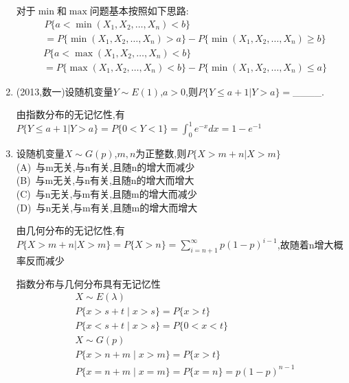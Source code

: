 \documentclass[12pt, a4paper, oneside, UTF8]{ctexbook}
\begin{document}
\begin{enumerate}[label=\arabic*.,start=6]
    \begin{tcolorbox}[title=总结]
        对于$\min\text{和}\max$问题基本按照如下思路:
        \begin{align*}
            &P\{a<\min{(X_1,X_2,\ldots,X_n)}<b\}  \\
            &= P\{\min{(X_1,X_2,\ldots,X_n)}>a\}-P\{\min{(X_1,X_2,\ldots,X_n)}\geq b\}
        \end{align*}
        \begin{align*}
        &P\{a<\max{(X_1,X_2,\ldots,X_n)}<b\} \\
        &=P\{\max{(X_1,X_2,\ldots,X_n)}<b\}-P\{\min{(X_1,X_2,\ldots,X_n)}\leq a\}
        \end{align*}
    \end{tcolorbox}
    \item  (2013,数一)设随机变量$Y\sim E(1)$,$a>0$,则$P\{Y\leq a+1|Y>a\}=$\_\_\_\_.
    
    \begin{solution}
    由指数分布的无记忆性,有$P\{Y\leq a+1|Y>a\}=P\{0<Y<1\}=\int_{0}^{1}e^{-x}dx=1-e^{-1}$
    \end{solution}
    
    \item  设随机变量$X\sim G(p)$,$m,n$为正整数,则$P\{X>m+n|X>m\}$ \\
    (A)\ 与m无关,与n有关,且随n的增大而减少 \\
    (B)\ 与m无关,与n有关,且随n的增大而增大 \\
    (C)\ 与n无关,与m有关,且随m的增大而减少 \\
    (D)\ 与n无关,与m有关,且随m的增大而增大

    \begin{solution}
    由几何分布的无记忆性,有$P\{X>m+n|X>m\}=P\{X>n\}=\sum_{i=n+1}^{\infty}p(1-p)^{i-1}$,故随着n增大概率反而减少
    \end{solution}
    \begin{tcolorbox}[title=总结]
        指数分布与几何分布具有无记忆性
        \begin{align*}
            &X\sim E(\lambda) \\
            &P\{x>s+t\mid x>s\}=P\{x>t\} \\
            &P\{x<s+t\mid x>s\}=P\{0<x<t\} \\
            &X\sim G(p) \\
            &P\{x>n+m\mid x>m\}=P\{x>t\} \\
            &P\{x=n+m\mid x=m\}=P\{x=n\}=p(1-p)^{n-1} \\
        \end{align*}
    \end{tcolorbox}
\end{enumerate}
\end{document}
